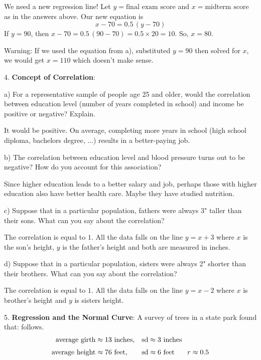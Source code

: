 \documentclass[10pt]{article}
\begin{document}
{\color{blue}We need a new regression line!  Let $y=\mbox{final exam score}$ and 
$x=\mbox{midterm score}$ as in the answers above.  Our new equation is
\[x - 70 = 0.5\,(y-70)\]
If $y = 90$, then $x-70=0.5\,(90-70) = 0.5\times 20 = 10$.  So, $x=80$.
\medskip

Warning:  If we used the equation from a), substituted $y=90$ then solved for $x$, we would 
get $x=110$ which doesn't make sense.}
\vfill
\eject

4. \textbf{Concept of Correlation}:

\hspace{20pt} a) For a representative sample of people age 25 and older, would the correlation between
education level (number of years completed in school) and income be positive or negative?  Explain.

{\color{blue}It would be positive.  On average, completing more years in school (high school diploma, 
bachelors degree, $\dots$) results in a better-paying job.}


\hspace{20pt} b) The correlation between education level and blood pressure turns out to 
be negative?  How do you account for this association?

{\color{blue} Since higher education leads to a better salary and job, perhaps those with 
higher education also have better health care.  Maybe they have studied nutrition.}


\hspace{20pt} c)  Suppose that in a particular population, fathers were always 3" taller than their sons.
What can you say about the correlation?

{\color{blue} The correlation is equal to $1$.  All the data falls on the line $y=x + 3$ where $x$ is
the son's height, $y$ is the father's height and both are measured in inches.}


\hspace{20pt} d)  Suppose that in a particular population, sisters were always 2" shorter than their brothers.
What can you say about the correlation?

{\color{blue} The correlation is equal to $1$.  All the data falls on the line
$y=x-2$ where $x$ is brother's height and $y$ is sisters height.}


5. \textbf{Regression and the Normal Curve}: A survey of trees in a state park found that:
follows. \vspace{-5pt}
\begin{align*}
\mbox{average girth}         & \approx \mbox{13 inches,}    & \mbox{sd} & \approx \mbox{3 inches}\\[3pt]
\mbox{average height}  & \approx \mbox{76 feet,}  & \mbox{sd} & \approx \mbox{6 feet
   \hspace{15pt}} r\approx 0.5
\end{align*}\vspace{-20pt}
\end{document}
